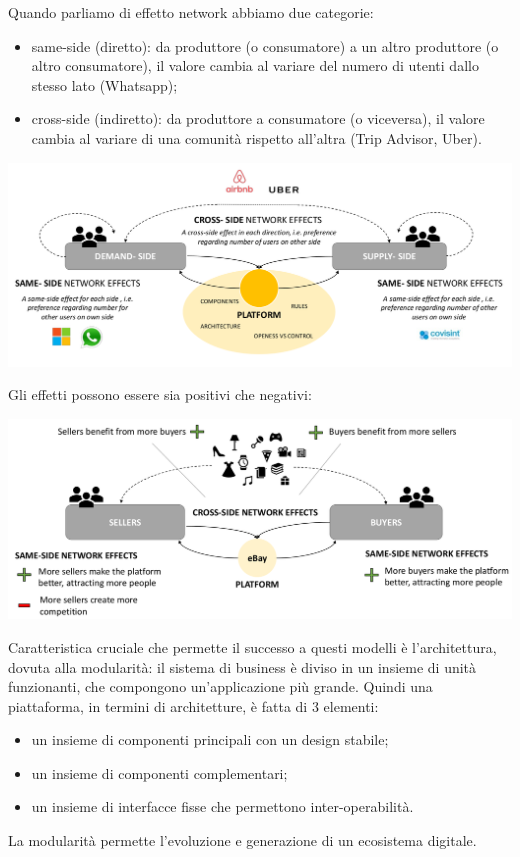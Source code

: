 \documentclass[a4page, 11pt]{article}
\begin{document}
Quando parliamo di effetto network abbiamo due categorie:
\begin{itemize}
  \item same-side (diretto): da produttore (o consumatore) a un altro produttore (o altro consumatore), il valore cambia al variare del numero di utenti dallo stesso lato (Whatsapp);
  \item cross-side (indiretto): da produttore a consumatore (o viceversa), il valore cambia al variare di una comunità rispetto all'altra (Trip Advisor, Uber).
\end{itemize}
\begin{center}
	\includegraphics[scale=0.35]{image5.png}
\end{center}
Gli effetti possono essere sia positivi che negativi:
\begin{center}
	\includegraphics[scale=0.35]{image6.png}
\end{center}

Caratteristica cruciale che permette il successo a questi modelli è l'architettura, dovuta alla modularità: il sistema di business è diviso in un insieme di unità funzionanti, che compongono un'applicazione più grande.
Quindi una piattaforma, in termini di architetture, è fatta di 3 elementi:
\begin{itemize}
  \item un insieme di componenti principali con un design stabile;
  \item un insieme di componenti complementari;
  \item un insieme di interfacce fisse che permettono inter-operabilità.
\end{itemize}
La modularità permette l'evoluzione e generazione di un ecosistema digitale.
\end{document}
